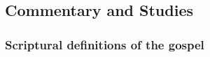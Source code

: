 	
	
\subsection{Commentary and Studies} %
	\label{GOSPEL-COMMENTARY}

	
		
	\subsubsection{Scriptural definitions of the gospel}
		\label{GOSPEL-definition}
		
